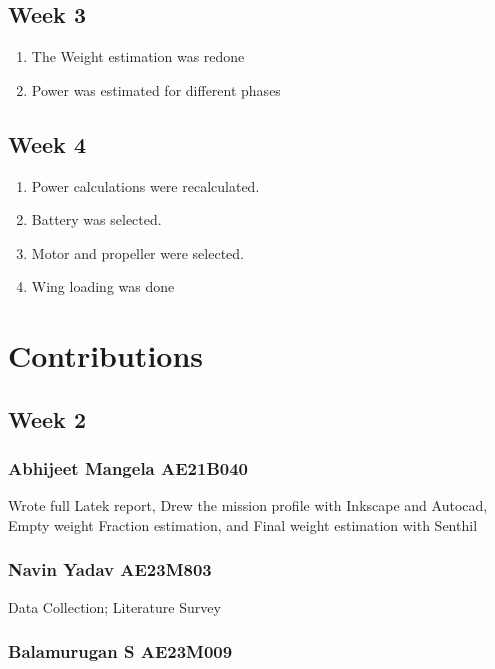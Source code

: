 \documentclass[12 pt]{article}
\begin{document}
{{\subsection{Week 3}
\begin{enumerate}
    \item The Weight estimation was redone
    \item Power was estimated for different phases 
\end{enumerate}

\subsection{Week 4}
\begin{enumerate}
    \item Power calculations were recalculated.
    \item Battery was selected.
    \item Motor and propeller were selected.
    \item Wing loading was done
\end{enumerate}

\newpage


\section{Contributions}

\subsection{Week 2}

\subsubsection{Abhijeet Mangela AE21B040}
Wrote full Latek report, Drew the mission profile with Inkscape and Autocad, Empty weight Fraction estimation, and Final weight estimation with Senthil

\subsubsection{Navin Yadav AE23M803}

Data Collection; Literature Survey

\subsubsection{Balamurugan S AE23M009}

}}
\end{document}
